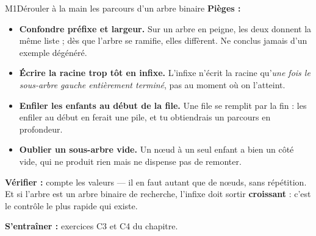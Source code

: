 \begin{fichemethode}{M1}{Dérouler à la main les parcours d'un arbre binaire}
\textbf{Pièges :}
\begin{itemize}
  \item \textbf{Confondre préfixe et largeur.} Sur un arbre en peigne, les deux donnent la
    même liste ; dès que l'arbre se ramifie, elles diffèrent. Ne conclus jamais d'un exemple
    dégénéré.
  \item \textbf{Écrire la racine trop tôt en infixe.} L'infixe n'écrit la racine qu'\emph{une
    fois le sous-arbre gauche entièrement terminé}, pas au moment où on l'atteint.
  \item \textbf{Enfiler les enfants au début de la file.} Une file se remplit par la fin : les
    enfiler au début en ferait une pile, et tu obtiendrais un parcours en profondeur.
  \item \textbf{Oublier un sous-arbre vide.} Un nœud à un seul enfant a bien un côté vide, qui
    ne produit rien mais ne dispense pas de remonter.
\end{itemize}

\textbf{Vérifier :} compte les valeurs — il en faut autant que de nœuds, sans répétition. Et
si l'arbre est un arbre binaire de recherche, l'infixe doit sortir \textbf{croissant} : c'est
le contrôle le plus rapide qui existe.

\textbf{S'entraîner :} exercices C3 et C4 du chapitre.
\end{fichemethode}
